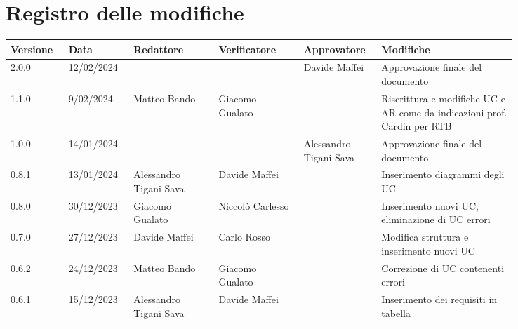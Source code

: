 \section*{Registro delle modifiche}


 {
  \renewcommand{\arraystretch}{1.5}
  \scriptsize
  \begin{longtable}{p{0.10\linewidth}p{0.10\linewidth}p{0.15\linewidth}p{0.15\linewidth}p{0.10\linewidth}p{0.24\linewidth}}
	  \textbf{Versione} & \textbf{Data} & \textbf{Redattore}     & \textbf{Verificatore}  & \textbf{Approvatore}   & \textbf{Modifiche}                                                       \\
	  \hline
	  2.0.0             & 12/02/2024    &                        &                        & Davide Maffei          & Approvazione finale del documento                                        \\
	  \hline
	  1.1.0             & 9/02/2024     & Matteo Bando           & Giacomo Gualato        &                        & Riscrittura e modifiche UC e AR come da indicazioni prof. Cardin per RTB \\
	  \hline
	  1.0.0             & 14/01/2024    &                        &                        & Alessandro Tigani Sava & Approvazione finale del documento                                        \\
	  \hline
	  0.8.1             & 13/01/2024    & Alessandro Tigani Sava & Davide Maffei          &                        & Inserimento diagrammi degli UC                                           \\
	  \hline
	  0.8.0             & 30/12/2023    & Giacomo Gualato        & Niccolò Carlesso       &                        & Inserimento nuovi UC, eliminazione di UC errori                          \\
	  \hline
	  0.7.0             & 27/12/2023    & Davide Maffei          & Carlo Rosso            &                        & Modifica struttura e inserimento nuovi UC                                \\
	  \hline
	  0.6.2             & 24/12/2023    & Matteo Bando           & Giacomo Gualato        &                        & Correzione di UC contenenti errori                                       \\
	  \hline
	  0.6.1             & 15/12/2023    & Alessandro Tigani Sava & Davide Maffei          &                        & Inserimento dei requisiti in tabella                                     \\

\end{longtable}}

